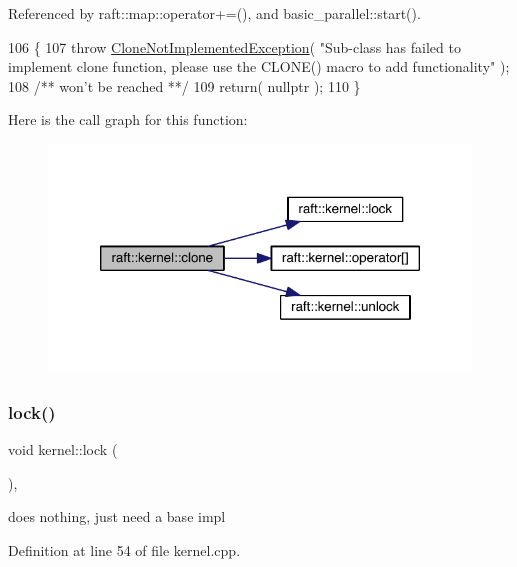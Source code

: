 Referenced by raft\+::map\+::operator+=(), and basic\+\_\+parallel\+::start().


\begin{DoxyCode}
106    \{
107       \textcolor{keywordflow}{throw} \hyperlink{class_clone_not_implemented_exception}{CloneNotImplementedException}( \textcolor{stringliteral}{"Sub-class has failed to implement
       clone function, please use the CLONE() macro to add functionality"} );\textcolor{comment}{}
108 \textcolor{comment}{      /** won't be reached **/}
109       \textcolor{keywordflow}{return}( \textcolor{keyword}{nullptr} );
110    \}
\end{DoxyCode}
Here is the call graph for this function\+:
\nopagebreak
\begin{figure}[H]
\begin{center}
\leavevmode
\includegraphics[width=320pt]{classraft_1_1kernel_a71bfffbbb3d40949e19be32e3d8f467f_cgraph}
\end{center}
\end{figure}
\hypertarget{classraft_1_1kernel_abd7f3bf1f689840f7d61f472f520c258}{}\label{classraft_1_1kernel_abd7f3bf1f689840f7d61f472f520c258} 
\subsubsection{\texorpdfstring{lock()}{lock()}}
{\footnotesize\ttfamily void kernel\+::lock (\begin{DoxyParamCaption}{ }\end{DoxyParamCaption})\hspace{0.3cm}{\ttfamily [protected]}, {\ttfamily [virtual]}}

does nothing, just need a base impl 

Definition at line 54 of file kernel.\+cpp.



